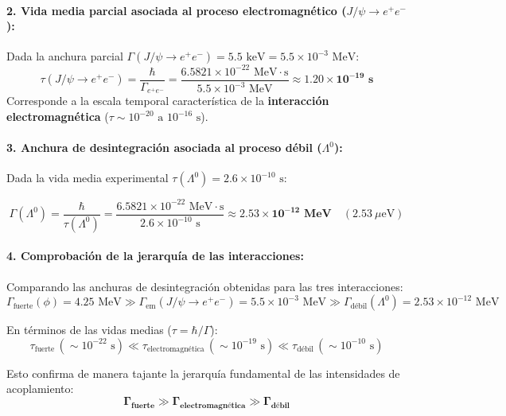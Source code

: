 \begin{problema}
\paragraph{2. Vida media parcial asociada al proceso electromagnético ($J/\psi \to e^+e^-$):}
Dada la anchura parcial $\Gamma(J/\psi \to e^+e^-) = 5.5\text{ keV} = 5.5 \times 10^{-3}\text{ MeV}$:
\begin{equation*}
\tau(J/\psi \to e^+e^-) = \frac{\hbar}{\Gamma_{e^+e^-}} = \frac{6.5821 \times 10^{-22}\text{ MeV}\cdot\text{s}}{5.5 \times 10^{-3}\text{ MeV}} \approx \mathbf{1.20 \times 10^{-19}\text{ s}}
\end{equation*}
Corresponde a la escala temporal característica de la \textbf{interacción electromagnética} ($\tau \sim 10^{-20}\text{ a } 10^{-16}\text{ s}$).

\paragraph{3. Anchura de desintegración asociada al proceso débil ($\Lambda^0$):}

Dada la vida media experimental $\tau(\Lambda^0) = 2.6 \times 10^{-10}\text{ s}$:

\begin{equation*}
    \Gamma(\Lambda^0) = \frac{\hbar}{\tau(\Lambda^0)} = \frac{6.5821 \times 10^{-22}\text{ MeV}\cdot\text{s}}{2.6 \times 10^{-10}\text{ s}} \approx \mathbf{2.53 \times 10^{-12}\text{ MeV}} \quad (2.53\ \mu\text{eV})
\end{equation*}

\paragraph{4. Comprobación de la jerarquía de las interacciones:}
Comparando las anchuras de desintegración obtenidas para las tres interacciones:
\begin{equation*}
\Gamma_{\text{fuerte}}(\phi) = 4.25\text{ MeV} \gg \Gamma_{\text{em}}(J/\psi \to e^+e^-) = 5.5 \times 10^{-3}\text{ MeV} \gg \Gamma_{\text{débil}}(\Lambda^0) = 2.53 \times 10^{-12}\text{ MeV}
\end{equation*}

En términos de las vidas medias ($\tau = \hbar / \Gamma$):
\begin{equation*}
\tau_{\text{fuerte}} \, (\sim 10^{-22}\text{ s}) \ll \tau_{\text{electromagnética}} \, (\sim 10^{-19}\text{ s}) \ll \tau_{\text{débil}} \, (\sim 10^{-10}\text{ s})
\end{equation*}

Esto confirma de manera tajante la jerarquía fundamental de las intensidades de acoplamiento:
\begin{equation*}
\mathbf{\Gamma_{\text{fuerte}} \gg \Gamma_{\text{electromagnética}} \gg \Gamma_{\text{débil}}}
\end{equation*}
\end{problema}
